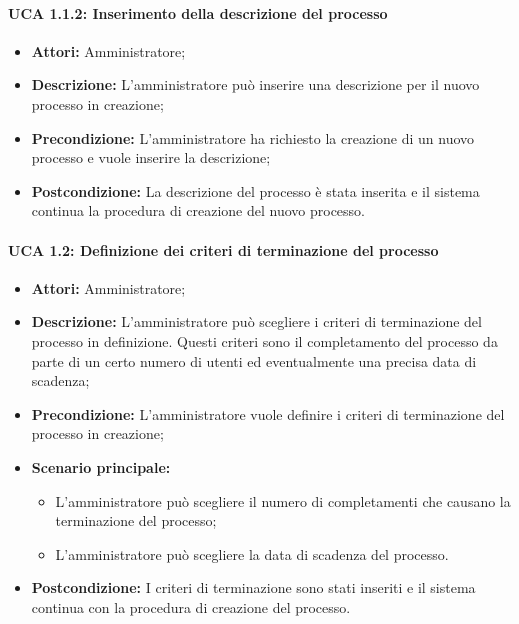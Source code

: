 \paragraph{UCA 1.1.2: Inserimento della descrizione del processo}
\begin{itemize}
\item \textbf{Attori:}
 Amministratore;
\item \textbf{Descrizione:} 
L'amministratore può inserire una descrizione per il nuovo processo in creazione; 
\item \textbf{Precondizione:}
 L'amministratore ha richiesto la creazione di un nuovo processo e vuole inserire la descrizione;
\item \textbf{Postcondizione:} 
La descrizione del processo è stata inserita e il sistema continua la procedura di creazione del nuovo processo.
\end{itemize}

\paragraph{UCA 1.2: Definizione dei criteri di terminazione del processo}
\begin{itemize}
\item \textbf{Attori:}
 Amministratore;
\item \textbf{Descrizione:}
 L'amministratore può scegliere i criteri di terminazione del processo in definizione.
Questi criteri sono il completamento del processo da parte di un certo numero di utenti ed eventualmente una precisa data di scadenza;
\item \textbf{Precondizione:}
 L'amministratore vuole definire i criteri di terminazione del processo in creazione;
\item \textbf{Scenario principale:}
\begin{itemize}
\item L'amministratore può scegliere il numero di completamenti che causano la terminazione del processo;
\item L'amministratore può scegliere la data di scadenza del processo.
\end{itemize}
\item \textbf{Postcondizione:} 
I criteri di terminazione sono stati inseriti  e il sistema continua con la procedura di creazione del processo.
\end{itemize}

